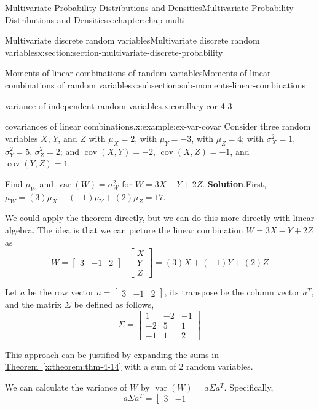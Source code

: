 \documentclass[oneside,10pt,]{book}
\newcommand{\blocktitlefont}{\relax}
\newcommand{\xreffont}{\relax}
\numberwithin{equation}{section}
\newcommand{\amp}{&}
\begin{document}
\begin{chapterptx}{Multivariate Probability Distributions and Densities}{}{Multivariate Probability Distributions and Densities}{}{}{x:chapter:chap-multi}
\begin{sectionptx}{Multivariate discrete random variables}{}{Multivariate discrete random variables}{}{}{x:section:section-multivariate-discrete-probability}
\begin{subsectionptx}{Moments of linear combinations of random variables}{}{Moments of linear combinations of random variables}{}{}{x:subsection:sub-moments-linear-combinations}
\begin{corollary}{variance of independent random variables.}{}{x:corollary:cor-4-3}
%
\end{corollary}
\begin{example}{covariances of linear combinations.}{x:example:ex-var-covar}%
Consider three random variables \(X\), \(Y\), and \(Z\) with \(\mu_X = 2\), with \(\mu_Y = -3\), with \(\mu_Z = 4\); with \(\sigma_X^2 = 1\), \(\sigma_Y^2 = 5\), \(\sigma_Z^2 =
2\); and \(\operatorname{cov}(X, Y) = -2\), \(\operatorname{cov}(X, Z) =
-1\), and \(\operatorname{cov}(Y, Z) = 1\).%
\par
Find \(\mu_W\) and \(\operatorname{var}(W) = \sigma_W^2\) for \(W = 3X-Y+2Z\).%
\textbf{\blocktitlefont Solution}.\quad{}First, \(\mu_W = (3)\mu_X + (-1)\mu_Y + (2)\mu_Z = 17\).%
\par
We could apply the theorem directly, but we can do this more directly with linear algebra. The idea is that we can picture the linear combination \(W = 3X-Y+2Z\) as%
\begin{equation*}
W =
\left[\begin{array}{ccc}3 \amp -1 \amp
2\end{array}\right]\cdot\left[\begin{array}{c}X \\Y\\
Z\end{array}\right] = (3)X + (-1)Y + (2)Z
\end{equation*}
%
\par
Let \(a\) be the row vector \(a = \left[\begin{array}{ccc}3 \amp -1
\amp 2\end{array}\right]\), its transpose be the column vector \(a^T\), and the matrix \(\Sigma\) be defined as follows,%
\begin{equation*}
\Sigma = \left[\begin{array}{ccc}
1 \amp -2 \amp -1\\
-2 \amp 5 \amp 1\\
-1 \amp 1 \amp 2
\end{array}\right]
\end{equation*}
%
\par
This approach can be justified by expanding the sums in \hyperref[x:theorem:thm-4-14]{Theorem~{\xreffont\ref{x:theorem:thm-4-14}}} with a sum of 2 random variables.%
\par
We can calculate the variance of \(W\) by \(\operatorname{var}(W)
= a\Sigma a^T\). Specifically,%
\begin{equation*}
a \Sigma a^T = \left[\begin{array}{ccc}3 \amp -1 \amp

\end{array}
\end{equation*}
\end{example}
\end{subsectionptx}
\end{sectionptx}
\end{chapterptx}
\end{document}
